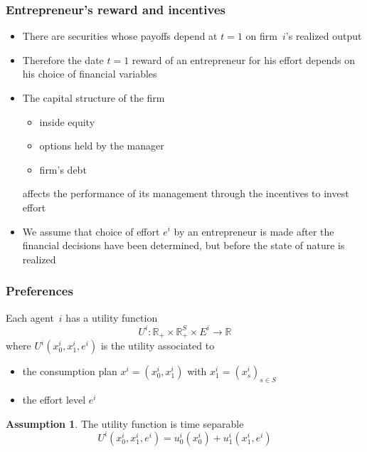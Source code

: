 \documentclass[blue]{beamer}
\def\R{\mathbb{R}}
\theoremstyle{definition}
\newtheorem*{assumption}{Assumption}
\theoremstyle{example}
\begin{document}
\begin{frame}\frametitle{Entrepreneur's reward and incentives}

\begin{itemize}
\item There are securities whose payoffs depend at $t=1$ on firm~$i$'s realized output
\item Therefore the date $t=1$ reward of an entrepreneur for his effort depends on his choice of financial variables
\item The capital structure of the firm
    \begin{itemize}
    \item inside equity
    \item options held by the manager
    \item firm's debt
    \end{itemize}
affects the performance of its management through the incentives to invest effort
\item We assume that choice of effort $e^i$ by an entrepreneur is made \alert{after} the financial decisions have been determined, but \alert{before} the state of nature is realized
\end{itemize}

\end{frame}


\begin{frame}\frametitle{Preferences}

Each agent~$i$ has a utility function
\[
U^i : \R_+ \times \R^S_+ \times E^i \longrightarrow \R
\]
where $U^i(x^i_0,x^i_1,e^i)$ is the utility associated to
\begin{itemize}
\item the consumption plan $x^i=(x^i_0,x^i_1)$ with $x^i_1=(x^i_s)_{s\in S}$
\item the effort level $e^i$
\end{itemize}

\begin{assumption}
The utility function is time separable
\[
U^i(x^i_0,x^i_1,e^i) = u^i_0(x^i_0) + u^i_1(x^i_1,e^i)
\]
\end{assumption}

\end{frame}

\end{document}
